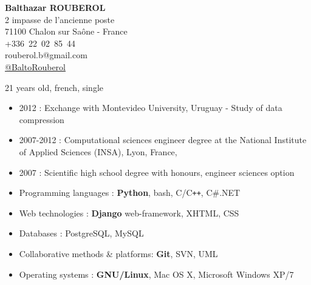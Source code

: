


\pagestyle{empty}

\begin{minipage}{0.4\textwidth}
\raggedright
{
        \textbf{{\Large Balthazar ROUBEROL}}\\
        \medskip
        {\scriptsize 2 impasse de l'ancienne poste\\
        71100 Chalon sur Saône - France \\
        +336~22~02~85~44 \\
        rouberol.b@gmail.com\\
        \href{https://twitter.com/BaltoRouberol}{@BaltoRouberol}}
}
\end{minipage}
\begin{minipage}{0.5\textwidth}
\raggedleft
{
}
\end{minipage}

\bigskip


{\scriptsize 21 years old, french, single}\\

\vspace{-3mm}

\begin{itemize}
\renewcommand{\labelitemi}{$\circ$}
		\item 2012 : Exchange with Montevideo University, Uruguay - Study of data compression
        \item 2007-2012 : Computational sciences engineer degree at the National Institute of Applied Sciences (INSA), Lyon, France, 
        \item 2007 : Scientific high school degree with honours, engineer sciences option
\end{itemize}


\begin{itemize}
\renewcommand{\labelitemi}{$\circ$}
    \item Programming languages : \textbf{Python}, bash, C/C{\tt ++}, C\#.NET
    \item Web technologies : \textbf{Django} web-framework, XHTML, CSS
    \item Databases : PostgreSQL, MySQL
    \item Collaborative methods \& platforms: \textbf{Git}, SVN, UML
    \item Operating systems : \textbf{GNU/Linux}, Mac OS X, Microsoft Windows XP/7
\end{itemize}


